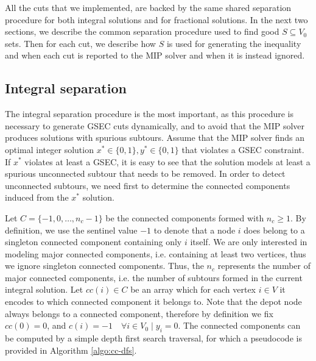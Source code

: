 All the cuts that we implemented, are backed by the same shared separation procedure for both integral solutions and for fractional solutions.
In the next two sections, we describe the common separation procedure used to find good $S \subseteq V_0$ sets.
Then for each cut, we describe how $S$ is used for generating the inequality and when each cut is reported to the MIP solver and when it is instead ignored.

\subsection{Integral separation}\label{sec:integral-separation}
The integral separation procedure is the most important, as this procedure is necessary to generate GSEC cuts dynamically, and to avoid that the MIP solver produces solutions with spurious subtours.
Assume that the MIP solver finds an optimal integer solution $x^* \in \{0, 1\}, y^* \in \{0, 1\}$ that violates a GSEC constraint.
If $x^*$ violates at least a GSEC, it is easy to see that the solution models at least a spurious unconnected subtour that needs to be removed.
In order to detect unconnected subtours, we need first to determine the connected components induced from the $x^*$ solution.

Let $C = \{-1, 0, \dots, n_c - 1\}$ be the connected components formed with $n_c \ge 1$.
By definition, we use the sentinel value $-1$ to denote that a node $i$ does belong to a singleton connected component containing only $i$ itself.
We are only interested in modeling major connected components, i.e. containing at least two vertices, thus we ignore singleton connected components.
Thus, the $n_c$ represents the number of major connected components, i.e. the number of subtours formed in the current integral solution.
Let $cc(i) \in C$ be an array which for each vertex $i \in V$ it encodes to which connected component it belongs to.
Note that the depot node always belongs to a connected component, therefore by definition we fix $cc(0) = 0$, and $c(i) = -1  \quad \forall i \in V_0 \mid y_i = 0$.
The connected components can be computed by a simple depth first search traversal, for which a pseudocode is provided in Algorithm \ref{algo:cc-dfs}.

